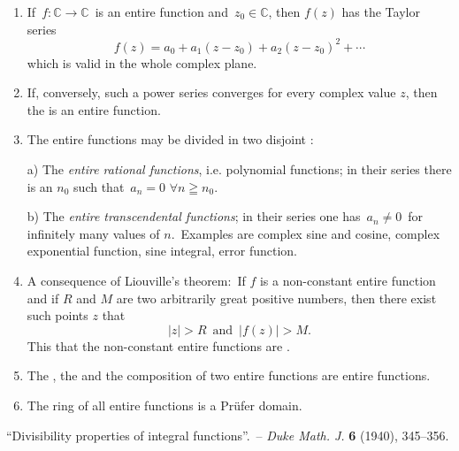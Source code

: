 \documentclass[12pt]{article}
\begin{document}
\begin{enumerate}

 \item If \,$f\!:\mathbb{C}\to\mathbb{C}$\, is an entire function and \,$z_0\in\mathbb{C}$, then $f(z)$ has the Taylor series 
$$f(z) = a_0\!+\!a_1(z\!-\!z_0)\!+\!a_2(z\!-\!z_0)^2\!+\cdots$$
which is valid in the whole complex plane.

 \item If, conversely, such a power series converges for every complex value $z$, then the  is an entire function.

 \item The entire functions may be divided in two disjoint :

a) The {\em entire rational functions}, i.e. polynomial functions; in their series  there is an $n_0$ such that\, $a_n = 0\,\,\forall n\geqq n_0$.

b) The {\em entire transcendental functions}; in their series  one has \,$a_n \neq 0$\, for infinitely many values of $n$.\, Examples are complex sine and cosine, complex exponential function, sine integral,  error function.

 \item A consequence of Liouville's theorem: \,If $f$ is a non-constant entire function and if $R$ and $M$ are two arbitrarily great positive numbers, then there exist such points $z$ that
        $$|z| > R \,\,\,\mathrm{and}\,\,\, |f(z)| > M.$$
This  that the non-constant entire functions are .

 \item The , the  and the composition of two entire functions are entire functions.

 \item The ring of all entire functions is a Pr\"ufer domain.

\end{enumerate}

\begin{thebibliography}{9}
 ``{Divisibility properties of integral functions}''.\, -- {\em Duke Math. J.} \textbf{6} (1940), 345--356.
\end{thebibliography}
\end{document}
